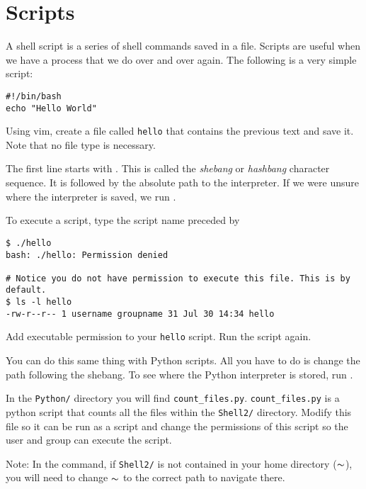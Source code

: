 \section*{Scripts} %

A shell script is a series of shell commands saved in a file.
Scripts are useful when we have a process that we do over and over again.
The following is a very simple script:

\begin{lstlisting}
#!/bin/bash
echo "Hello World"
\end{lstlisting}

\begin{problem}
Using vim, create a file called \texttt{hello} that contains the previous text and save it.
Note that no file type is necessary.
\end{problem}

The first line starts with .
This is called the \emph{shebang} or \emph{hashbang} character sequence.
It is followed by the absolute path to the  interpreter.
If we were unsure where the  interpreter is saved, we run .

To execute a script, type the script name preceded by 

\begin{lstlisting}
$ ./hello
bash: ./hello: Permission denied

# Notice you do not have permission to execute this file. This is by default.
$ ls -l hello
-rw-r--r-- 1 username groupname 31 Jul 30 14:34 hello
\end{lstlisting}

\begin{problem}
Add executable permission to your \texttt{hello} script.
Run the script again.
\end{problem}

You can do this same thing with Python scripts.
All you have to do is change the path following the shebang.
To see where the Python interpreter is stored, run .

\begin{problem}
In the \texttt{Python/} directory you will find \texttt{count\_files.py}.
\texttt{count\_files.py} is a python script that counts all the files within the \texttt{Shell2/} directory.
Modify this file so it can be run as a script and change the permissions of this script so the user and group can execute the script.

Note: In the  command, if \texttt{Shell2/} is not contained in your home directory ($\thicksim$), you will need to change $\thicksim$ to the correct path to navigate there.
\end{problem}

